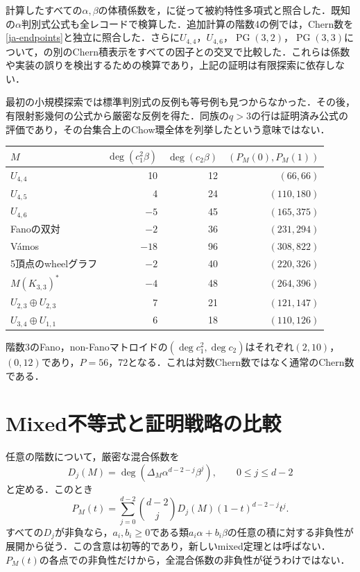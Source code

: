 \documentclass[12pt]{amsart}
\theoremstyle{definition}
\theoremstyle{remark}
\numberwithin{equation}{section}
\begin{document}
計算したすべての$\alpha,\beta$の体積係数を，\cite[Proposition 9.5]{AHK}に従って被約特性多項式と照合した．既知の$\alpha$判別式公式も全レコードで検算した．追加計算の階数4の例では，Chern数を\eqref{ja-endpoints}と独立に照合した．さらに$U_{4,4}$，$U_{4,6}$，$\operatorname{PG}(3,2)$，$\operatorname{PG}(3,3)$について，\cite[Theorem 3.4]{Che}の別のChern積表示をすべての因子との交叉で比較した．これらは係数や実装の誤りを検出するための検算であり，上記の証明は有限探索に依存しない．

最初の小規模探索では標準判別式の反例も等号例も見つからなかった．その後，有限射影幾何の公式から厳密な反例を得た．同族の$q>3$の行は証明済み公式の評価であり，その台集合上のChow環全体を列挙したという意味ではない．

\begin{center}\small
\begin{tabular}{lrrr}
\toprule
$M$&$\deg(c_1^2\beta)$&$\deg(c_2\beta)$&$(P_M(0),P_M(1))$\\\midrule
$U_{4,4}$&10&12&$(66,66)$\\
$U_{4,5}$&4&24&$(110,180)$\\
$U_{4,6}$&$-5$&45&$(165,375)$\\
Fanoの双対&$-2$&36&$(231,294)$\\
V\'amos&$-18$&96&$(308,822)$\\
5頂点のwheelグラフ&$-2$&40&$(220,326)$\\
$M(K_{3,3})^*$&$-4$&48&$(264,396)$\\
$U_{2,3}\oplus U_{2,3}$&7&21&$(121,147)$\\
$U_{3,4}\oplus U_{1,1}$&6&18&$(110,126)$\\
\bottomrule
\end{tabular}
\end{center}
階数3のFano，non-Fanoマトロイドの$(\deg c_1^2,\deg c_2)$はそれぞれ$(2,10)$，$(0,12)$であり，$P=56$，$72$となる．これは対数Chern数ではなく通常のChern数である．

\section{Mixed不等式と証明戦略の比較}
任意の階数について，厳密な混合係数を
\[
 D_j(M)=\deg(\Delta_M\alpha^{d-2-j}\beta^j),\qquad 0\leq j\leq d-2
\]
と定める．このとき
\begin{equation}\label{ja-bernstein}
 P_M(t)=\sum_{j=0}^{d-2}\binom{d-2}{j}D_j(M)(1-t)^{d-2-j}t^j.
\end{equation}
すべての$D_j$が非負なら，$a_i,b_i\geq0$である類$a_i\alpha+b_i\beta$の任意の積に対する非負性が展開から従う．この含意は初等的であり，新しいmixed定理とは呼ばない．$P_M(t)$の各点での非負性だけから，全混合係数の非負性が従うわけではない．
\end{document}
